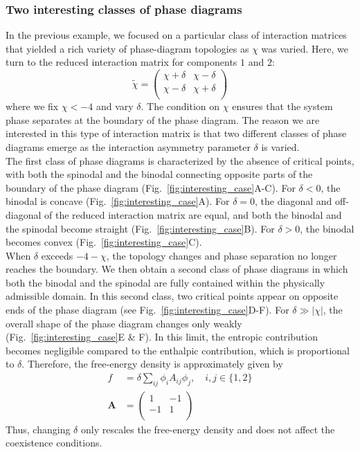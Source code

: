 \documentclass[12pt]{article}
\begin{document}
\subsubsection{Two interesting classes of phase diagrams}
In the previous example, we focused on a particular class of interaction matrices that yielded a rich variety of phase-diagram topologies as \(\chi\) was varied.
Here, we turn to the reduced interaction matrix for components \(1\) and \(2\):
\[
\tilde{\chi}=
\begin{pmatrix}
\chi+\delta& \chi-\delta\\
\chi-\delta& \chi+\delta\\
\end{pmatrix}
\]
where we fix $\chi<-4$ and vary $\delta$.
The condition on \(\chi\) ensures that the system phase separates at the boundary of the phase diagram.
The reason we are interested in this type of interaction matrix is that two different classes of phase diagrams emerge as the interaction asymmetry parameter \(\delta\) is varied.\\

The first class of phase diagrams is characterized by the absence of critical points, with both the spinodal and the binodal connecting opposite parts of the boundary of the phase diagram (Fig.~\ref{fig:interesting_case}A-C).
For $\delta<0$, the binodal is concave (Fig.~\ref{fig:interesting_case}A).
For $\delta=0$, the diagonal and off-diagonal of the reduced interaction matrix are equal, and both the binodal and the spinodal become straight (Fig.~\ref{fig:interesting_case}B).
For $\delta>0$, the binodal becomes convex (Fig.~\ref{fig:interesting_case}C).\\
When $\delta$ exceeds $-4-\chi$, the topology changes and phase separation no longer reaches the boundary. We then obtain a second class of phase diagrams in which both the binodal and the spinodal are fully contained within the physically admissible domain.
In this second class, two critical points appear on opposite ends of the phase diagram (see Fig.~\ref{fig:interesting_case}D-F). For $\delta\gg|\chi|$, the overall shape of the phase diagram changes only weakly (Fig.~\ref{fig:interesting_case}E \& F).
In this limit, the entropic contribution becomes negligible compared to the enthalpic contribution, which is proportional to $\delta$.
Therefore, the free-energy density is approximately given by
\[
\begin{aligned}
    f  &= \delta\sum_{ij}\phi_i A_{ij} \phi_j,\quad i,j \in \{1,2\}\\
\boldsymbol A &=
\begin{pmatrix}
1& -1\\
-1& 1\\
\end{pmatrix}
\end{aligned}
\]
Thus, changing $\delta$ only rescales the free-energy density and does not affect the coexistence conditions.
\end{document}
